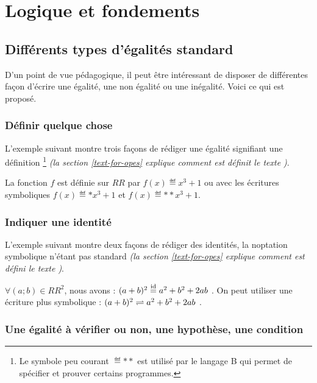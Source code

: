 \documentclass[12pt,a4paper]{article}
\newcommand\RR{RR}
\begin{document}
\section{Logique et fondements}

    \subsection{Différents types d'égalités \og standard \fg}
    
D'un point de vue pédagogique, il peut être intéressant de disposer de différentes façon d'écrire une égalité, une non égalité ou une inégalité. Voici ce qui est proposé.

        \subsubsection{Définir quelque chose}

L'exemple suivant montre trois façons de rédiger une égalité signifiant une définition
\footnote{
	Le symbole peu courant $\eqdef**$ est utilisé par le langage B qui permet de spécifier et prouver certains programmes.
}
\emph{(la section \ref{text-for-opes} explique comment est définit le texte \emph{\og \textopdef \fg})}.

\begin{tcblisting}{}
La fonction $f$ est définie sur $\RR$ par $f(x) \eqdef x^3 + 1$ ou avec les écritures 
symboliques $f(x) \eqdef* x^3 + 1$ et $f(x) \eqdef** x^3 + 1$.
\end{tcblisting}


        \subsubsection{Indiquer une identité}

L'exemple suivant montre deux façons de rédiger des identités, la noptation symbolique n'étant pas standard \emph{(la section \ref{text-for-opes} explique comment est défini le texte \emph{\og \textopid \fg})}.

\begin{tcblisting}{}
$\forall (a ; b) \in \RR^2$, nous avons : $(a + b)^2 \eqid a^2 + b^2 + 2 a b$ .
On peut utiliser une écriture plus symbolique : $(a + b)^2 \eqid* a^2 + b^2 + 2 a b$ .
\end{tcblisting}


        \subsubsection{Une égalité à vérifier ou non, une hypothèse, une condition}
\end{document}
